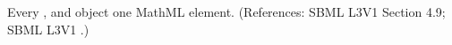 Every \AssignmentRule, \RateRule and \AlgebraicRule object
 one MathML  element.  (References: SBML L3V1 Section 4.9; SBML L3V1
.)
